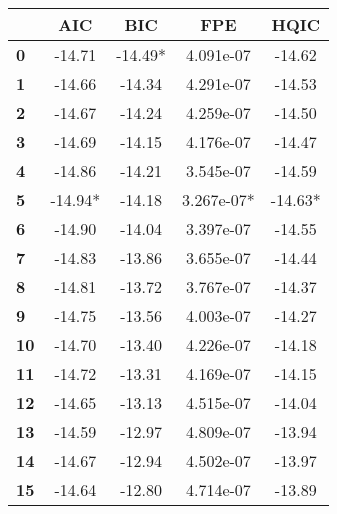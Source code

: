 \begin{center}
\begin{tabular}{lcccc}
\toprule
            & \textbf{AIC} & \textbf{BIC} & \textbf{FPE} & \textbf{HQIC}  \\
\midrule
\textbf{0}  &      -14.71  &     -14.49*  &   4.091e-07  &       -14.62   \\
\textbf{1}  &      -14.66  &      -14.34  &   4.291e-07  &       -14.53   \\
\textbf{2}  &      -14.67  &      -14.24  &   4.259e-07  &       -14.50   \\
\textbf{3}  &      -14.69  &      -14.15  &   4.176e-07  &       -14.47   \\
\textbf{4}  &      -14.86  &      -14.21  &   3.545e-07  &       -14.59   \\
\textbf{5}  &     -14.94*  &      -14.18  &  3.267e-07*  &      -14.63*   \\
\textbf{6}  &      -14.90  &      -14.04  &   3.397e-07  &       -14.55   \\
\textbf{7}  &      -14.83  &      -13.86  &   3.655e-07  &       -14.44   \\
\textbf{8}  &      -14.81  &      -13.72  &   3.767e-07  &       -14.37   \\
\textbf{9}  &      -14.75  &      -13.56  &   4.003e-07  &       -14.27   \\
\textbf{10} &      -14.70  &      -13.40  &   4.226e-07  &       -14.18   \\
\textbf{11} &      -14.72  &      -13.31  &   4.169e-07  &       -14.15   \\
\textbf{12} &      -14.65  &      -13.13  &   4.515e-07  &       -14.04   \\
\textbf{13} &      -14.59  &      -12.97  &   4.809e-07  &       -13.94   \\
\textbf{14} &      -14.67  &      -12.94  &   4.502e-07  &       -13.97   \\
\textbf{15} &      -14.64  &      -12.80  &   4.714e-07  &       -13.89   \\
\bottomrule
\end{tabular}
\end{center}